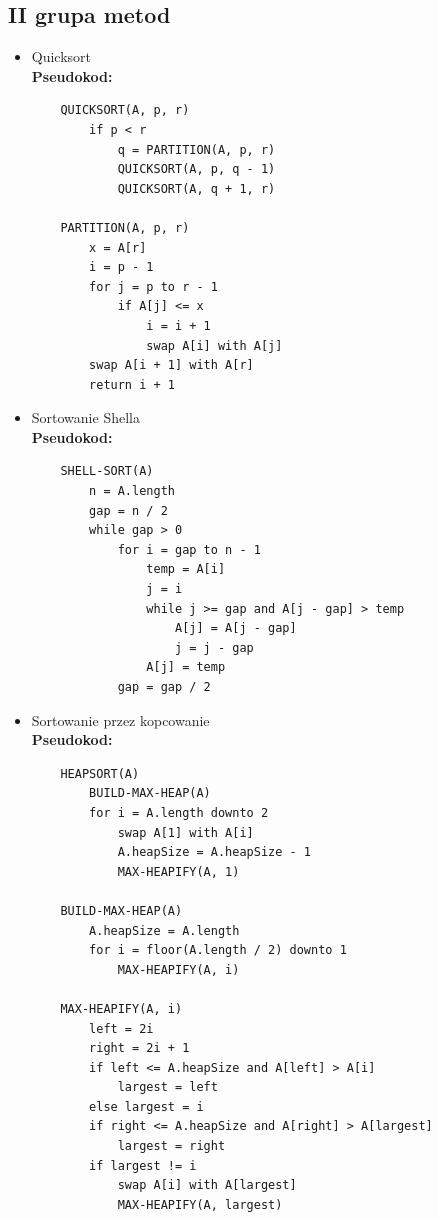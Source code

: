 \documentclass{article}
\begin{document}
\subsection*{II grupa metod}
\begin{itemize}
    \item Quicksort\\
    \textbf{Pseudokod:}
    \begin{verbatim}
    QUICKSORT(A, p, r)
        if p < r
            q = PARTITION(A, p, r)
            QUICKSORT(A, p, q - 1)
            QUICKSORT(A, q + 1, r)
    
    PARTITION(A, p, r)
        x = A[r]
        i = p - 1
        for j = p to r - 1
            if A[j] <= x
                i = i + 1
                swap A[i] with A[j]
        swap A[i + 1] with A[r]
        return i + 1
    \end{verbatim}
    
    \item Sortowanie Shella\\
    \textbf{Pseudokod:}
    \begin{verbatim}
    SHELL-SORT(A)
        n = A.length
        gap = n / 2
        while gap > 0
            for i = gap to n - 1
                temp = A[i]
                j = i
                while j >= gap and A[j - gap] > temp
                    A[j] = A[j - gap]
                    j = j - gap
                A[j] = temp
            gap = gap / 2
    \end{verbatim}
    
    \item Sortowanie przez kopcowanie\\
    \textbf{Pseudokod:}
    \begin{verbatim}
    HEAPSORT(A)
        BUILD-MAX-HEAP(A)
        for i = A.length downto 2
            swap A[1] with A[i]
            A.heapSize = A.heapSize - 1
            MAX-HEAPIFY(A, 1)
    
    BUILD-MAX-HEAP(A)
        A.heapSize = A.length
        for i = floor(A.length / 2) downto 1
            MAX-HEAPIFY(A, i)
    
    MAX-HEAPIFY(A, i)
        left = 2i
        right = 2i + 1
        if left <= A.heapSize and A[left] > A[i]
            largest = left
        else largest = i
        if right <= A.heapSize and A[right] > A[largest]
            largest = right
        if largest != i
            swap A[i] with A[largest]
            MAX-HEAPIFY(A, largest)
    \end{verbatim}
\end{itemize}
\end{document}
